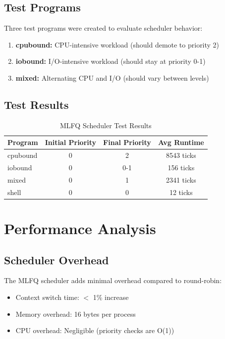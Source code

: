 \documentclass[a4paper,12pt]{report}
\begin{document}
\subsection{Test Programs}

Three test programs were created to evaluate scheduler behavior:

\begin{enumerate}
    \item \textbf{cpubound:} CPU-intensive workload (should demote to priority 2)
    \item \textbf{iobound:} I/O-intensive workload (should stay at priority 0-1)
    \item \textbf{mixed:} Alternating CPU and I/O (should vary between levels)
\end{enumerate}

\subsection{Test Results}

\begin{table}[H]
\centering
\begin{tabular}{|l|c|c|c|}
\hline
\textbf{Program} & \textbf{Initial Priority} & \textbf{Final Priority} & \textbf{Avg Runtime} \\
\hline
cpubound & 0 & 2 & 8543 ticks \\
iobound & 0 & 0-1 & 156 ticks \\
mixed & 0 & 1 & 2341 ticks \\
shell & 0 & 0 & 12 ticks \\
\hline
\end{tabular}
\caption{MLFQ Scheduler Test Results}
\label{tab:mlfq_tests}
\end{table}

\section{Performance Analysis}

\subsection{Scheduler Overhead}

The MLFQ scheduler adds minimal overhead compared to round-robin:

\begin{itemize}
    \item Context switch time: $<$ 1\% increase
    \item Memory overhead: 16 bytes per process
    \item CPU overhead: Negligible (priority checks are O(1))
\end{itemize}
\end{document}

